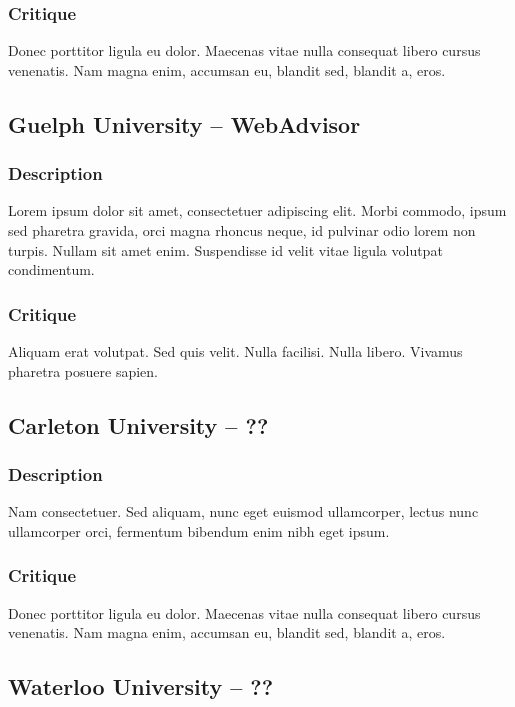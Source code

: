 \documentclass[10pt]{article}
\begin{document}
\begin{multicols}{2}
\subsubsection*{Critique}
Donec porttitor ligula eu dolor. Maecenas vitae nulla consequat libero cursus venenatis. Nam magna enim, accumsan eu, blandit sed, blandit a, eros.

\subsection*{Guelph University -- WebAdvisor}
\subsubsection*{Description}
Lorem ipsum dolor sit amet, consectetuer adipiscing elit. Morbi commodo, ipsum sed pharetra gravida, orci magna rhoncus neque, id pulvinar odio lorem non turpis. Nullam sit amet enim. Suspendisse id velit vitae ligula volutpat condimentum. 

\subsubsection*{Critique}
Aliquam erat volutpat. Sed quis velit. Nulla facilisi. Nulla libero. Vivamus pharetra posuere sapien. 

\subsection*{Carleton University -- ??}
\subsubsection*{Description}
Nam consectetuer. Sed aliquam, nunc eget euismod ullamcorper, lectus nunc ullamcorper orci, fermentum bibendum enim nibh eget ipsum. 

\subsubsection*{Critique}
Donec porttitor ligula eu dolor. Maecenas vitae nulla consequat libero cursus venenatis. Nam magna enim, accumsan eu, blandit sed, blandit a, eros.

\subsection*{Waterloo University -- ??}

\end{multicols}
\end{document}
